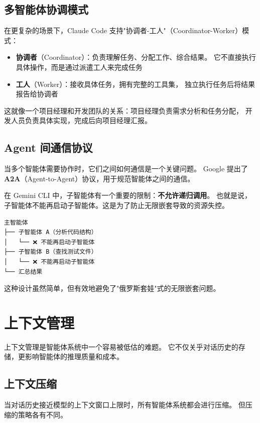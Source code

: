 \subsection{多智能体协调模式}

在更复杂的场景下，Claude Code 支持"协调者-工人"（Coordinator-Worker）模式：

\begin{itemize}
    \item \textbf{协调者}（Coordinator）：负责理解任务、分配工作、综合结果。
        它不直接执行具体操作，而是通过派遣工人来完成任务
    \item \textbf{工人}（Worker）：接收具体任务，拥有完整的工具集，
        独立执行任务后将结果报告给协调者
\end{itemize}

这就像一个项目经理和开发团队的关系：项目经理负责需求分析和任务分配，
开发人员负责具体实现，完成后向项目经理汇报。

\subsection{Agent 间通信协议}

当多个智能体需要协作时，它们之间如何通信是一个关键问题。
Google 提出了 \textbf{A2A}（Agent-to-Agent）协议，用于规范智能体之间的通信。

在 Gemini CLI 中，子智能体有一个重要的限制：\textbf{不允许递归调用}。
也就是说，子智能体不能再启动子智能体。这是为了防止无限嵌套导致的资源失控。

\begin{verbatim}
主智能体
├── 子智能体 A（分析代码结构）
│   └── ❌ 不能再启动子智能体
├── 子智能体 B（查找测试文件）
│   └── ❌ 不能再启动子智能体
└── 汇总结果
\end{verbatim}

这种设计虽然简单，但有效地避免了"俄罗斯套娃"式的无限嵌套问题。

\section{上下文管理}

上下文管理是智能体系统中一个容易被低估的难题。
它不仅关乎对话历史的存储，更影响智能体的推理质量和成本。

\subsection{上下文压缩}

当对话历史接近模型的上下文窗口上限时，所有智能体系统都会进行压缩。
但压缩的策略各有不同。

